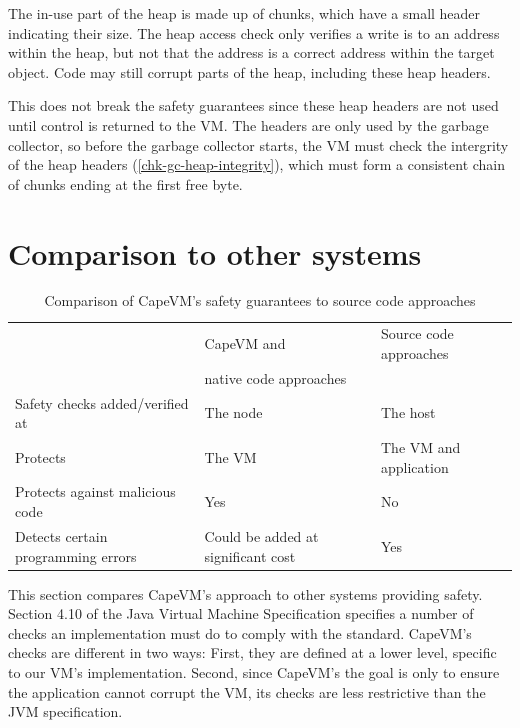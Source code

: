 The in-use part of the heap is made up of chunks, which have a small header indicating their size. The heap access check only verifies a write is to an address within the heap, but not that the address is a correct address within the target object. Code may still corrupt parts of the heap, including these heap headers.

This does not break the safety guarantees since these heap headers are not used until control is returned to the VM. The headers are only used by the garbage collector, so before the garbage collector starts, the VM must check the intergrity of the heap headers (\ref{chk-gc-heap-integrity}), which must form a consistent chain of chunks ending at the first free byte.



\section{Comparison to other systems}

\begin{table}
\caption{Comparison of CapeVM's safety guarantees to source code approaches}
\label{tbl-safety-comparison-source-code-approaches}
    \begin{tabular}{p{}p{}p{}} %
    \toprule
                                                & CapeVM and                                  & Source code approaches \\
                                                & native code approaches                      & \\
    \midrule
    \midrule
    Safety checks added/verified at             & The node                                    & The host \\
    Protects                                    & The VM                                      & The VM and application \\
    Protects against malicious code             & Yes                                         & No \\
    Detects certain programming errors          & Could be added at significant cost          & Yes \\
    \bottomrule
    \end{tabular}
\end{table}

This section compares CapeVM's approach to other systems providing safety. Section 4.10 of the Java Virtual Machine Specification \cite{Lindholm:2017vu} specifies a number of checks an implementation must do to comply with the standard. CapeVM's checks are different in two ways: First, they are defined at a lower level, specific to our VM's implementation. Second, since CapeVM's the goal is only to ensure the application cannot corrupt the VM, its checks are less restrictive than the JVM specification.

